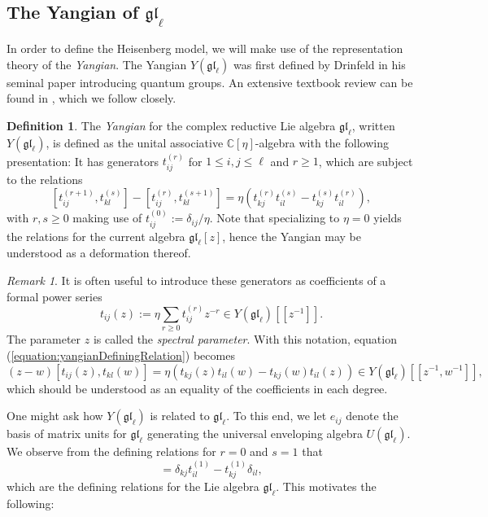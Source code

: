 \documentclass[11pt]{report}
\theoremstyle{definition}
\newtheorem{definition}[theorem]{Definition}
\theoremstyle{remark}
\newtheorem*{remark}{Remark}
\theoremstyle{remark}
\newcommand{\C}{\mathbb{C}}
\begin{document}
\subsection{The Yangian of $\mathfrak{gl}_\ell$}

In order to define the Heisenberg model, we will make use of the representation theory of the \emph{Yangian}. The Yangian $Y(\mathfrak{gl}_\ell)$ was first defined by Drinfeld in his seminal paper \cite{article:drinfeld:1985} introducing quantum groups. An extensive textbook review can be found in \cite{book:molev}, which we follow closely.

\begin{definition}
The \emph{Yangian} for the complex reductive Lie algebra $\mathfrak{gl}_\ell$, written $Y(\mathfrak{gl}_\ell)$, is defined as the unital associative $\C[\eta]$-algebra with the following presentation: It has generators $t_{ij}^{(r)}$ for $1 \leq i,j \leq \ell$ and $r \geq 1$, which are subject to the relations
\begin{equation}\label{equation:yangianDefiningRelation}
[t_{ij}^{(r+1)},t_{kl}^{(s)}] - [t_{ij}^{(r)},t_{kl}^{(s+1)}] = \eta(t_{kj}^{(r)} t_{il}^{(s)} - t_{kj}^{(s)} t_{il}^{(r)}),
\end{equation}
with $r,s \geq 0$ making use of $t_{ij}^{(0)} := \delta_{ij}/\eta$. Note that specializing to $\eta = 0$ yields the relations for the current algebra $\mathfrak{gl}_\ell[z]$, hence the Yangian may be understood as a deformation thereof.
\end{definition}

\begin{remark}
It is often useful to introduce these generators as coefficients of a formal power series
\begin{equation*}
t_{ij}(z) := \eta \sum_{r \geq 0} t_{ij}^{(r)} z^{-r} \in Y(\mathfrak{gl}_\ell)[[z^{-1}]].
\end{equation*}
The parameter $z$ is called the \emph{spectral parameter}. With this notation, equation (\ref{equation:yangianDefiningRelation}) becomes
\begin{equation}\label{equation:yangianDefiningRelationUV}
(z-w) [t_{ij}(z),t_{kl}(w)] = \eta(t_{kj}(z) t_{il}(w) - t_{kj}(w) t_{il}(z)) \in Y(\mathfrak{gl}_\ell)[[z^{-1},w^{-1}]],
\end{equation}
which should be understood as an equality of the coefficients in each degree.
\end{remark}

One might ask how $Y(\mathfrak{gl}_\ell)$ is related to $\mathfrak{gl}_\ell$. To this end, we let $e_{ij}$ denote the basis of matrix units for $\mathfrak{gl}_\ell$ generating the universal enveloping algebra $U(\mathfrak{gl}_\ell)$. We observe from the defining relations for $r=0$ and $s=1$ that
\begin{equation*}
[t_{ij}^{(1)},t_{kl}^{(1)}] = \delta_{kj} t_{il}^{(1)} - t_{kj}^{(1)} \delta_{il},
\end{equation*}
which are the defining relations for the Lie algebra $\mathfrak{gl}_\ell$. This motivates the following:
\end{document}
